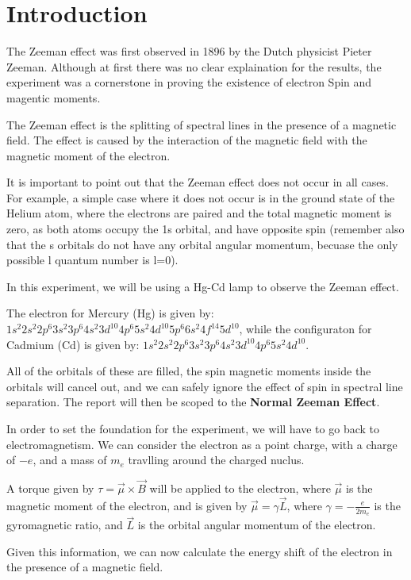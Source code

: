 \section{Introduction}

The Zeeman effect was first observed in 1896 by the Dutch physicist Pieter Zeeman. Although at first there was no clear explaination
for the results, the experiment was a cornerstone in proving the existence of electron Spin and magentic moments.

The Zeeman effect is the splitting of spectral lines in the presence of a magnetic field. The effect is caused by the
interaction of the magnetic field with the magnetic moment of the electron.

It is important to point out that the Zeeman effect does not occur in all cases. For example, a simple case where it does not occur
is in the ground state of the Helium atom, where the electrons are paired and the total magnetic moment is zero, as both atoms occupy the 1s orbital,
and have opposite spin (remember also that the s orbitals do not have any orbital angular momentum, becuase the only possible l
quantum number is l=0).

In this experiment, we will be using a Hg-Cd lamp to observe the Zeeman effect.

The electron for Mercury (Hg) is given by: $1s^2  2s^2 2p^6 3s^2 3p^6 4s^2  3d^10 4p^6 5s^2  4d^10 5p^6  6s^2 4f^14 5d^10$, while the
configuraton for Cadmium (Cd) is given by: $1s^2 2s^2 2p^6 3s^2 3p^6 4s^2 3d^10 4p^6 5s^2 4d^10$.

All of the orbitals of these are filled, the spin magnetic moments inside the orbitals will cancel out,
and we can safely ignore the effect of spin in spectral line separation. The report will then be scoped to the
\textbf{Normal Zeeman Effect}.

In order to set the foundation for the experiment, we will have to go back to electromagnetism.
We can consider the electron as a point charge, with a charge of $-e$, and a mass of $m_e$ travlling around the
charged nuclus.

A torque given by $\tau = \vec{\mu} \times \vec{B}$ will be applied to the electron, where $\vec{\mu}$ is the
magnetic moment of the electron,
and is given by $\vec{\mu} = \gamma \vec{L}$, where $\gamma = - \frac{e}{2 m_e}$ is the gyromagnetic ratio,
and $\vec{L}$ is the orbital angular momentum of the electron.

Given this information, we can now calculate the energy shift of the electron in the presence of a magnetic field.

